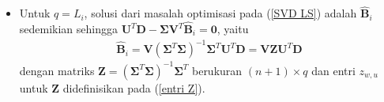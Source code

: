 \begin{itemize}
    \begin{equation} \label{entri Z}
    \begin{aligned}
        z_{w,u} &=
        \begin{dcases}
        \frac{1}{\sqrt{\lambda_w}}, & \text{jika } w=u\\
        0, & w,u \text{ lainnya}
        \end{dcases}
        \\ 
        \text{untuk } & w=1,2,\ldots,n+1\text{, dan } u=1,2,\ldots,q
    \end{aligned}    
    \end{equation}
    
    \item Untuk $q=L_i$, solusi dari masalah optimisasi pada (\ref{SVD LS}) adalah $\mathbf{\hat{B}}_i$ sedemikian sehingga $ \mathbf{U}^T\mathbf{D} - \mathbf{\Sigma}\mathbf{V}^T\mathbf{\hat{B}}_i = \mathbf{0}$, yaitu
    \begin{align} \label{hasil B 2}
        \mathbf{\hat{B}}_i = \mathbf{V}\left(\mathbf{\Sigma}^T\mathbf{\Sigma} \right)^{-1}\mathbf{\Sigma}^T \mathbf{U}^T\mathbf{D} = \mathbf{V} \mathbf{Z} \mathbf{U}^T \mathbf{D}
    \end{align}
    dengan matriks $\mathbf{Z} = \left(\mathbf{\Sigma}^T\mathbf{\Sigma} \right)^{-1}\mathbf{\Sigma}^T$ berukuran $(n+1)\times q$ dan entri $z_{w,u}$ untuk $\mathbf{Z}$ didefinisikan pada (\ref{entri Z}).
\end{itemize}

